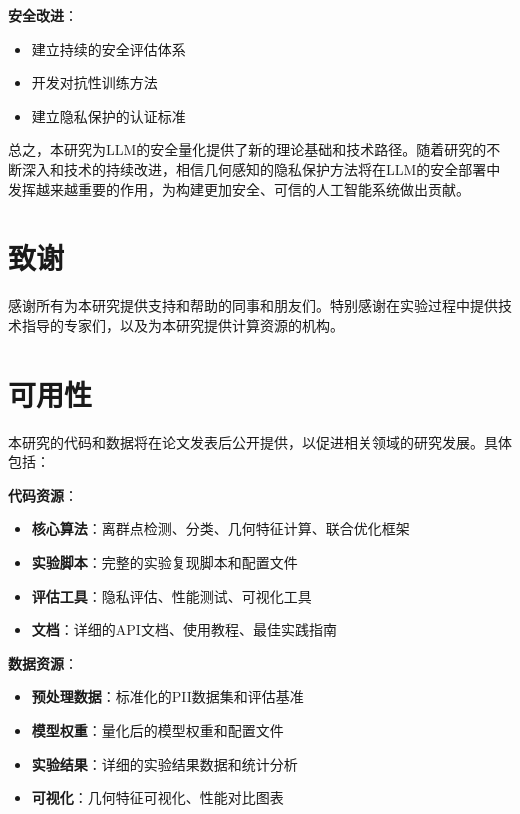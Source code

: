 \textbf{安全改进}：
\begin{itemize}
\item 建立持续的安全评估体系
\item 开发对抗性训练方法
\item 建立隐私保护的认证标准
\end{itemize}

总之，本研究为LLM的安全量化提供了新的理论基础和技术路径。随着研究的不断深入和技术的持续改进，相信几何感知的隐私保护方法将在LLM的安全部署中发挥越来越重要的作用，为构建更加安全、可信的人工智能系统做出贡献。

\section*{致谢}

感谢所有为本研究提供支持和帮助的同事和朋友们。特别感谢在实验过程中提供技术指导的专家们，以及为本研究提供计算资源的机构。

\section*{可用性}

本研究的代码和数据将在论文发表后公开提供，以促进相关领域的研究发展。具体包括：

\textbf{代码资源}：
\begin{itemize}
\item \textbf{核心算法}：离群点检测、分类、几何特征计算、联合优化框架
\item \textbf{实验脚本}：完整的实验复现脚本和配置文件
\item \textbf{评估工具}：隐私评估、性能测试、可视化工具
\item \textbf{文档}：详细的API文档、使用教程、最佳实践指南
\end{itemize}

\textbf{数据资源}：
\begin{itemize}
\item \textbf{预处理数据}：标准化的PII数据集和评估基准
\item \textbf{模型权重}：量化后的模型权重和配置文件
\item \textbf{实验结果}：详细的实验结果数据和统计分析
\item \textbf{可视化}：几何特征可视化、性能对比图表
\end{itemize}

